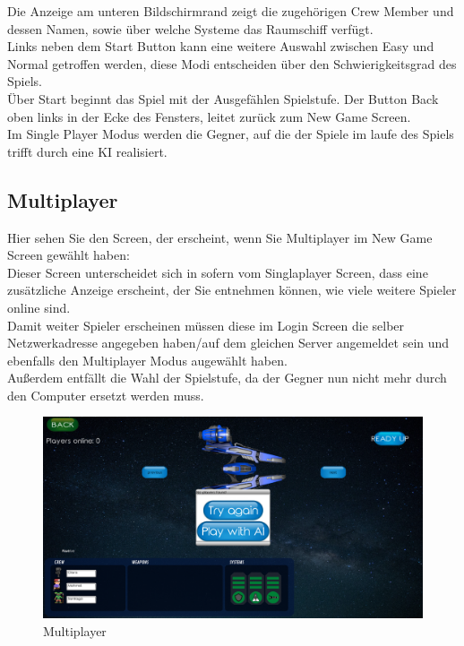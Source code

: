 \documentclass[fontsize=12pt,paper=a4,twoside]{scrartcl}
\begin{document}
Die Anzeige am unteren Bildschirmrand zeigt die zugehörigen Crew Member und dessen Namen, sowie über welche Systeme das Raumschiff verfügt.\\
Links neben dem Start Button kann eine weitere Auswahl zwischen Easy und Normal getroffen werden, diese Modi entscheiden über den Schwierigkeitsgrad des Spiels.\\
Über Start beginnt das Spiel mit der Ausgefählen Spielstufe.
Der Button Back oben links in der Ecke des Fensters, leitet zurück zum New Game Screen.\\
Im Single Player Modus werden die Gegner, auf die der Spiele im laufe des Spiels trifft durch eine KI realisiert.

\newpage
\subsection{Multiplayer}

Hier sehen Sie den Screen, der erscheint, wenn Sie  Multiplayer im New Game Screen gewählt haben:\\
Dieser Screen unterscheidet sich in sofern vom Singlaplayer Screen, dass eine zusätzliche Anzeige erscheint, der Sie entnehmen können, wie viele weitere Spieler online sind.\\
Damit weiter Spieler erscheinen müssen diese im Login Screen die selber Netzwerkadresse angegeben haben/auf dem gleichen Server angemeldet sein und ebenfalls den Multiplayer Modus augewählt haben.\\
Außerdem entfällt die Wahl der Spielstufe, da der Gegner nun nicht mehr durch den Computer ersetzt werden muss.

\begin{figure}[htp]
	\centering
	\includegraphics[width=1.00\linewidth]{pics/MultiPlayer01.png}
	\caption{Multiplayer}
	\label{fig1}
\end{figure}
\end{document}
